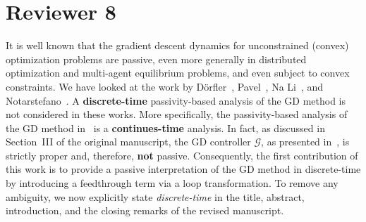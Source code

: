 \section*{Reviewer 8}\label{sec:reviewer8}
\renewcommand{\theequation}{R8.\arabic{equation}}
\setcounter{equation}{0}
\begin{rebuttal}[resolved]
    {%
        It is well known that the gradient descent dynamics for unconstrained (convex) optimization problems are passive, even more generally in distributed optimization and multi-agent equilibrium problems, and even subject to convex constraints.
    }%
    {%
        We have looked at the work by Dörfler~\cite{dorfler_energy}, Pavel~\cite{pavel_passivity_ct}, Na Li~\cite{li_passivity}, and Notarstefano~\cite{Notarstefano}. A \textbf{discrete-time} passivity-based analysis of the GD method is not considered in these works. More specifically, the passivity-based analysis of the GD method in~\cite{pavel_passivity_ct,li_passivity} is a \textbf{continues-time} analysis. In fact, as discussed in Section~III of the original manuscript, the GD controller \(\bm{\mathcal{G}}\), as presented in~\cite{lessard_recht_iqc}, is strictly proper and, therefore, \textbf{not} passive. Consequently, the first contribution of this work is to provide a passive interpretation of the GD method in discrete-time by introducing a feedthrough term via a loop transformation. To remove any ambiguity, we now explicitly state \emph{discrete-time} in the title, abstract, introduction, and the closing remarks of the revised manuscript.
    }%
\end{rebuttal}
